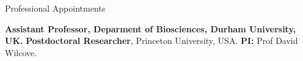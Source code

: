 \begin{rubric}{Professional Appointments}

%
	\textbf{Assistant Professor, Deparment of Biosciences, Durham University, UK.}
%
\entry*[2019 -- 2021]%
	\textbf{Postdoctoral Researcher}, Princeton University, USA. \textbf{PI:} Prof David Wilcove.
%
\end{rubric}